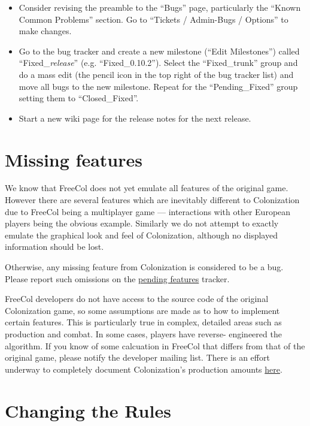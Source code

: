 \documentclass[12pt]{book}
\begin{document}
\begin{itemize}
\item Consider revising the preamble to the ``Bugs'' page,
  particularly the ``Known Common Problems'' section. Go to ``Tickets /
  Admin-Bugs / Options'' to make changes.

\item Go to the bug tracker and create a new milestone (``Edit
  Milestones'') called ``Fixed\_\emph{release}''
  (e.g. ``Fixed\_0.10.2''). Select the ``Fixed\_trunk'' group and do a
  mass edit (the pencil icon in the top right of the bug tracker list)
  and move all bugs to the new milestone. Repeat for the
  ``Pending\_Fixed'' group setting them to ``Closed\_Fixed''.

\item Start a new wiki page for the release notes for the next
  release.

\end{itemize}


\hypertarget{Missing features}{\chapter{Missing features}}

We know that FreeCol does not yet emulate all features of the original
game. However there are several features which are inevitably
different to Colonization due to FreeCol being a multiplayer game ---
interactions with other European players being the obvious example.
Similarly we do not attempt to exactly emulate the graphical look and
feel of Colonization, although no displayed information should be lost.

Otherwise, any missing feature from Colonization is considered to be a
bug. Please report such omissions on the
\href{https://sourceforge.net/p/freecol/pending-features-for-freecol/}{pending
  features} tracker.

FreeCol developers do not have access to the source code of the original
Colonization game, so some assumptions are made as to how to implement
certain features. This is particularly true in complex, detailed areas
such as production and combat. In some cases, players have reverse-
engineered the algorithm. If you know of some calcuation in FreeCol that
differs from that of the original game, please notify the developer mailing
list. There is an effort underway to completely document Colonization's
 production amounts
\href{https://sourceforge.net/p/freecol/wiki/WWC1D\%20-\%20resource\%20output\%20v2/}{here}.


\hypertarget{Changing the Rules}{\chapter{Changing the Rules}}
\end{document}
